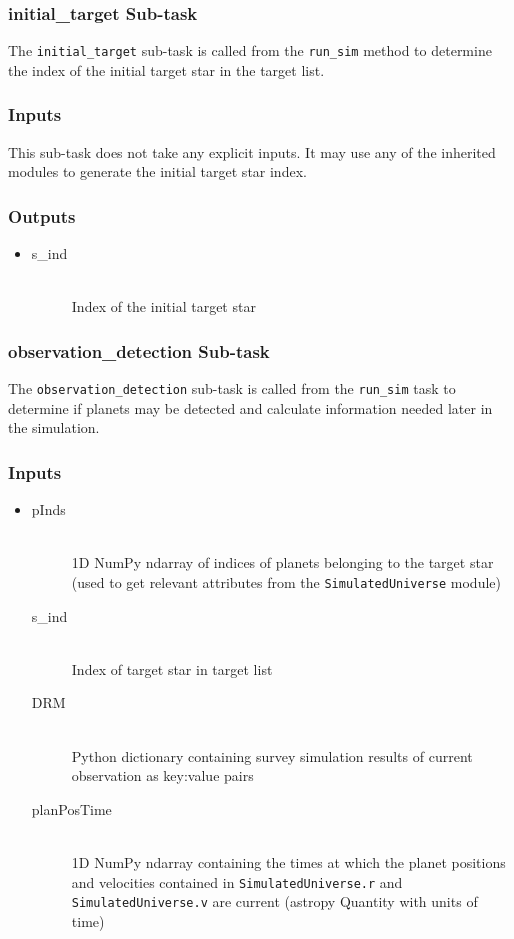 \documentclass[cleanfoot]{asme2ej}
\begin{document}
\subsubsection{initial\_target Sub-task} \label{sec:initialtargettask}
The \verb+initial_target+ sub-task is called from the \verb+run_sim+ method to determine the index of the initial target star in the target list.

\subsubsection*{Inputs}
This sub-task does not take any explicit inputs.  It may use any of the inherited modules to generate the initial target star index.

\subsubsection*{Outputs}
\begin{itemize}
    \item 
    \begin{description}
        \item[s\_ind] \hfill \\
        Index of the initial target star
    \end{description}
\end{itemize}

\subsubsection{observation\_detection Sub-task} \label{sec:observationdetectiontask}
The \verb+observation_detection+ sub-task is called from the \verb+run_sim+ task to determine if planets may be detected and calculate information needed later in the simulation.

\subsubsection*{Inputs}
\begin{itemize}
    \item 
    \begin{description}
        \item[pInds] \hfill \\
        1D NumPy ndarray of indices of planets belonging to the target star (used to get relevant attributes from the \verb+SimulatedUniverse+ module)
        \item[s\_ind] \hfill \\
        Index of target star in target list
        \item[DRM] \hfill \\
        Python dictionary containing survey simulation results of current observation as key:value pairs
        \item[planPosTime] \hfill \\
        1D NumPy ndarray containing the times at which the planet positions and velocities contained in \verb+SimulatedUniverse.r+ and \verb+SimulatedUniverse.v+ are current (astropy Quantity with units of time)
    \end{description}
\end{itemize}
\end{document}
